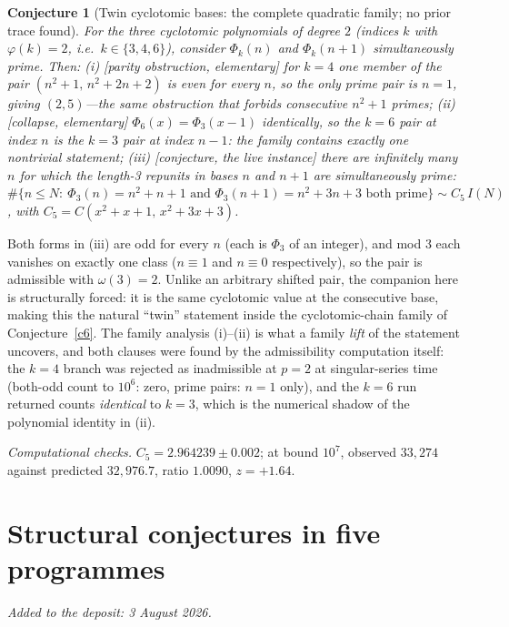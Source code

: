 \documentclass[11pt]{article}
\newtheorem{conjecture}{Conjecture}
\theoremstyle{definition}
\begin{document}
\setcounter{conjecture}{24}%
\begin{conjecture}[Twin cyclotomic bases: the complete quadratic
family; no prior trace found]\label{c5}
For the three cyclotomic polynomials of degree $2$ (indices $k$ with
$\varphi(k)=2$, i.e.\ $k\in\{3,4,6\}$), consider
$\Phi_k(n)$ and $\Phi_k(n+1)$ simultaneously prime.  Then:
\emph{(i)} [parity obstruction, elementary] for $k=4$ one member of
the pair $(n^2+1,\,n^2+2n+2)$ is even for \emph{every} $n$, so the
only prime pair is $n=1$, giving $(2,5)$---the same obstruction that
forbids consecutive $n^2+1$ primes;
\emph{(ii)} [collapse, elementary] $\Phi_6(x)=\Phi_3(x-1)$
identically, so the $k=6$ pair at index $n$ \emph{is} the $k=3$ pair
at index $n-1$: the family contains exactly one nontrivial statement;
\emph{(iii)} [conjecture, the live instance] there are infinitely many
$n$ for which the length-3 repunits in bases $n$ and $n+1$ are
simultaneously prime:
$\#\{n\le N:\ \Phi_3(n)=n^2+n+1 \text{ and }
\Phi_3(n+1)=n^2+3n+3 \text{ both prime}\}\sim C_5\,I(N)$,
with $C_5=C(x^2+x+1,\,x^2+3x+3)$.
\end{conjecture}

Both forms in (iii) are odd for every $n$ (each is $\Phi_3$ of an
integer), and mod $3$ each vanishes on exactly one class ($n\equiv1$
and $n\equiv0$ respectively), so the pair is admissible with
$\omega(3)=2$.  Unlike an arbitrary shifted pair, the companion here is
structurally
forced: it is the same cyclotomic
value at the consecutive base, making this the natural ``twin''
statement inside the cyclotomic-chain family of Conjecture~\ref{c6}.
The family analysis (i)--(ii) is what a family \emph{lift} of the
statement uncovers, and both clauses were found by the admissibility
computation itself: the $k=4$ branch was rejected as inadmissible
at $p=2$ at singular-series time (both-odd count to $10^6$: zero,
prime pairs: $n=1$ only), and the $k=6$ run returned counts
\emph{identical} to $k=3$, which is the numerical shadow of the
polynomial identity in (ii).

\emph{Computational checks.}  $C_5=2.964239\pm0.002$; at bound $10^{7}$,
observed $33{,}274$ against predicted $32{,}976.7$, ratio $1.0090$,
$z=+1.64$.

\part{Structural conjectures in five programmes}

\medskip\noindent\emph{Added to the deposit: 3 August 2026.}\par\medskip
\end{document}
